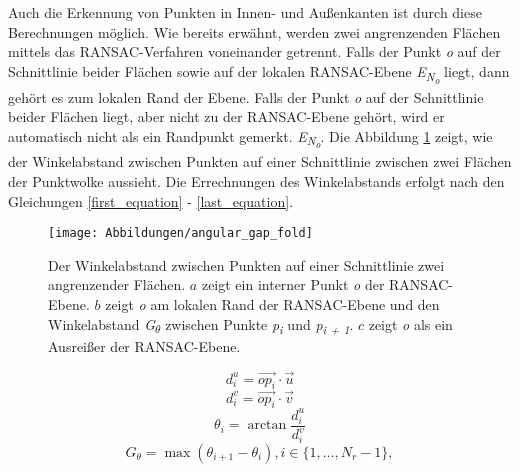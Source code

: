 Auch die Erkennung von Punkten in Innen- und Außenkanten ist durch diese Berechnungen möglich. Wie bereits erwähnt, werden zwei angrenzenden Flächen mittels das RANSAC-Verfahren voneinander getrennt. Falls der Punkt \textit{o} auf der Schnittlinie beider Flächen sowie auf der lokalen RANSAC-Ebene \textit{E\textsubscript{N\textsubscript{o}}} liegt, dann gehört es zum lokalen Rand der Ebene. Falls der Punkt \textit{o} auf der Schnittlinie beider Flächen liegt, aber nicht zu der RANSAC-Ebene gehört, wird er automatisch nicht als ein Randpunkt gemerkt. \textit{E\textsubscript{N\textsubscript{o}}}. Die Abbildung \ref{edge_fold} zeigt, wie der Winkelabstand zwischen Punkten auf einer Schnittlinie zwischen zwei Flächen der Punktwolke aussieht. Die Errechnungen des Winkelabstands erfolgt nach den Gleichungen \ref{first_equation} - \ref{last_equation}.

\begin{figure}[h]
	\texttt{[image: Abbildungen/angular\_gap\_fold]}
	\centering
	\caption{Der Winkelabstand zwischen Punkten auf einer Schnittlinie zwei angrenzender Flächen. \textbf{\(a\)} zeigt ein interner Punkt \textit{o} der RANSAC-Ebene. \textbf{\(b\)} zeigt \textit{o} am lokalen Rand der RANSAC-Ebene und den Winkelabstand \textit{G\textsubscript{$\theta$}} zwischen Punkte \textit{p\textsubscript{i}} und \textit{p\textsubscript{i + 1}}. \textbf{\(c\)} zeigt \textit{o} als ein Ausreißer der RANSAC-Ebene. \autocite{ni_edge_2016}}
	\label{edge_fold}
\end{figure}

\begin{equation}
\label{first_equation}
d_i^u = \vec{{op}_i} \cdot \vec{u}
\end{equation}
\begin{equation}
d_i^v = \vec{{op}_i} \cdot \vec{v}
\end{equation}
\begin{equation}
\theta_i = \arctan{\frac{d_i^u}{d_i^v}}
\end{equation}
\begin{equation}
G_\theta = \max(\theta_{i + 1} - \theta_i), i \in \{1, \ldots, N_r - 1\},
\label{last_equation}
\end{equation}


